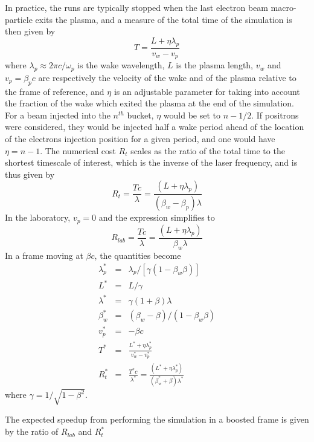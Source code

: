 \documentclass[]{report}
\begin{document}
In practice, the runs are typically stopped when the last electron beam macro-particle exits the plasma, and a measure of the total time of the simulation is then given by
%
\begin{equation}
T=\frac{L+\eta \lambda_p}{v_w-v_p}
\end{equation}
%
where $\lambda_p\approx 2\pi c/\omega_p$ is the wake wavelength, $L$ is the plasma length, $v_w$ and $v_p=\beta_p c$ are respectively the velocity of the wake and of the plasma relative to the frame of reference, and $\eta$ is an adjustable parameter for taking into account the fraction of the wake which exited the plasma at the end of the simulation.
For a beam injected into the $n^{th}$ bucket, $\eta$ would be set to $n-1/2$. If positrons were considered, they would be injected half a wake period ahead of the location of the electrons injection position for a given period, and one would have $\eta=n-1$. The numerical cost $R_t$ scales as the ratio of the total time to the shortest timescale of interest, which is the inverse of the laser frequency, and is thus given by
%
\begin{equation}
R_t=\frac{T c}{\lambda}=\frac{\left(L+\eta \lambda_p\right)}{\left(\beta_w-\beta_p\right) \lambda}
\end{equation}
%
In the laboratory, $v_p=0$ and the expression simplifies to
%
\begin{equation}
R_{lab}=\frac{T c}{\lambda}=\frac{\left(L+\eta \lambda_p\right)}{\beta_w \lambda}
\end{equation}
%
In a frame moving at $\beta c$, the quantities become
\begin{eqnarray}
\lambda_p^*&=&\lambda_p/\left[\gamma \left(1-\beta_w \beta\right)\right] \\
L^*&=&L/\gamma \\
\lambda^*&=& \gamma\left(1+\beta\right) \lambda\\
\beta_w^*&=&\left(\beta_w-\beta\right)/\left(1-\beta_w\beta\right) \\
v_p^*&=&-\beta c \\
T^*&=&\frac{L^*+\eta \lambda_p^*}{v_w^*-v_p^*} \\
R_t^*&=&\frac{T^* c}{\lambda^*} = \frac{\left(L^*+\eta \lambda_p^*\right)}{\left(\beta_w^*+\beta\right) \lambda^*}
\end{eqnarray}
where $\gamma=1/\sqrt{1-\beta^2}$.

The expected speedup from performing the simulation in a boosted frame is given by the ratio of $R_{lab}$ and $R_t^*$
\end{document}
